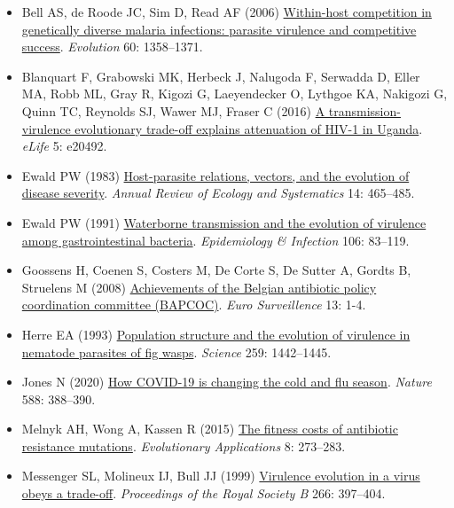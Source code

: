 \documentclass[
]{book}
\begin{document}
\begin{itemize}
\item
  Bell AS, de Roode JC, Sim D, Read AF (2006) \href{https://onlinelibrary.wiley.com/doi/abs/10.1111/j.0014-3820.2006.tb01215.x}{Within-host competition in genetically diverse malaria infections: parasite virulence and competitive success}. \emph{Evolution} 60: 1358--1371.
\item
  Blanquart F, Grabowski MK, Herbeck J, Nalugoda F, Serwadda D, Eller MA, Robb ML, Gray R, Kigozi G, Laeyendecker O, Lythgoe KA, Nakigozi G, Quinn TC, Reynolds SJ, Wawer MJ, Fraser C (2016) \href{https://elifesciences.org/articles/20492}{A transmission-virulence evolutionary trade-off explains attenuation of HIV-1 in Uganda}. \emph{eLife} 5: e20492.
\item
  Ewald PW (1983) \href{https://www.annualreviews.org/doi/10.1146/annurev.es.14.110183.002341}{Host-parasite relations, vectors, and the evolution of disease severity}. \emph{Annual Review of Ecology and Systematics} 14: 465--485.
\item
  Ewald PW (1991) \href{https://www.cambridge.org/core/journals/epidemiology-and-infection/article/waterborne-transmission-and-the-evolution-of-virulence-among-gastrointestinal-bacteria/295EB4F5E51B7AA0D946C27973053725}{Waterborne transmission and the evolution of virulence among gastrointestinal bacteria}. \emph{Epidemiology \& Infection} 106: 83--119.
\item
  Goossens H, Coenen S, Costers M, De Corte S, De Sutter A, Gordts B, Struelens M (2008) \href{https://www.eurosurveillance.org/content/10.2807/ese.13.46.19036-en}{Achievements of the Belgian antibiotic policy coordination committee (BAPCOC)}. \emph{Euro Surveillence} 13: 1-4.
\item
  Herre EA (1993) \href{https://www.science.org/doi/abs/10.1126/science.259.5100.1442}{Population structure and the evolution of virulence in nematode parasites of fig wasps}. \emph{Science} 259: 1442--1445.
\item
  Jones N (2020) \href{https://www.nature.com/articles/d41586-020-03519-3}{How COVID-19 is changing the cold and flu season}. \emph{Nature} 588: 388--390.
\item
  Melnyk AH, Wong A, Kassen R (2015) \href{https://onlinelibrary.wiley.com/doi/10.1111/eva.12196}{The fitness costs of antibiotic resistance mutations}. \emph{Evolutionary Applications} 8: 273--283.
\item
  Messenger SL, Molineux IJ, Bull JJ (1999) \href{https://royalsocietypublishing.org/doi/10.1098/rspb.1999.0651}{Virulence evolution in a virus obeys a trade-off}. \emph{Proceedings of the Royal Society B} 266: 397--404.

\end{itemize}
\end{document}
